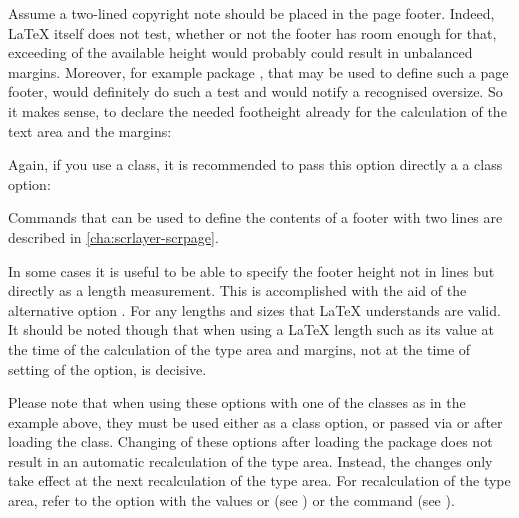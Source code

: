 \begin{Example}
  Assume a two-lined copyright note should be placed in the page
  footer. Indeed, \LaTeX{} itself does not test, whether or not the footer has
  room enough for that, exceeding of the available height would probably could
  result in unbalanced margins. Moreover, for example package
  , that may be used to define such a page footer,
  would definitely do such a test and would notify a recognised oversize. So
  it makes sense, to declare the needed footheight already for the calculation
  of the text area and the margins:
  Again, if you use a \KOMAScript{} class, it is recommended to pass this
  option directly a a class option:
  Commands that can be used to define the contents of a footer with two lines
  are described in \autoref{cha:scrlayer-scrpage}.
\end{Example}

In some cases it is useful to be able to specify the footer height not
in lines but directly as a length measurement. This is accomplished
with the aid of the alternative option . For
 any lengths and sizes that \LaTeX{} understands are
valid. It should be noted though that when using a \LaTeX{} length
such as  its value at the time of the calculation
of the type area and margins, not at the time of setting of the
option, is decisive.

Please note that when using these options with one of the
{\KOMAScript} classes as in the example above, they must be used
either as a class option, or passed via  or
 after loading the class. Changing of these options
after loading the  package does not result in an
automatic recalculation of the type area. Instead, the changes only
take effect at the next recalculation of the type area. For
recalculation of the type area, refer to the  option with
the values  or  (see
) or the
 command (see
).%
\EndIndexGroup


